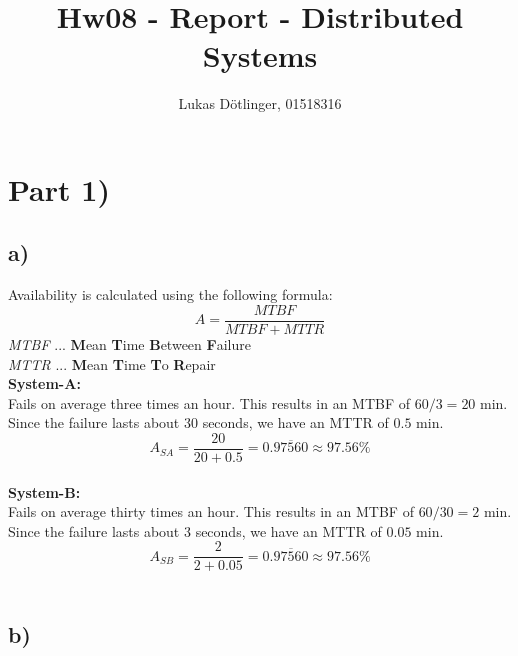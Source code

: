 \documentclass{article}
\begin{document}
  \title{Hw08 - Report - Distributed Systems}
  \date{}
  \author{Lukas Dötlinger, 01518316}
	
  \maketitle
  
  \section*{Part 1)}
    \subsection*{a)}
  
    Availability is calculated using the following formula:\\
    \begin{equation}
      A = \frac{MTBF}{MTBF + MTTR}
    \end{equation}
    \textit{MTBF} ... \textbf{M}ean \textbf{T}ime \textbf{B}etween \textbf{F}ailure\\
    \textit{MTTR} ... \textbf{M}ean \textbf{T}ime \textbf{T}o \textbf{R}epair\\
    \newline
    \textbf{System-A:}\\
    Fails on average three times an hour. This results in an MTBF of $60/3 = 20$ min. Since the failure lasts about 30 seconds, we have an MTTR of $0.5$ min.\\
    \[ A_{SA} = \frac{20}{20+0.5} = 0.\overline{97560} \approx 97.56 \% \]\\
    \newline
    \textbf{System-B:}\\
    Fails on average thirty times an hour. This results in an MTBF of $60/30 = 2$ min. Since the failure lasts about 3 seconds, we have an MTTR of $0.05$ min.\\
    \[ A_{SB} = \frac{2}{2+0.05} = 0.\overline{97560} \approx 97.56 \% \]\\
    
    \newpage
    \subsection*{b)}
    
\end{document}
